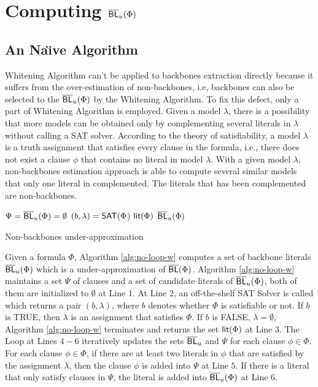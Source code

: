 \section{Computing $\overline{\textsf{BL}}_u(\Phi)$}




\subsection{An Na\"{\i}ve Algorithm}



Whitening Algorithm can't be applied to backbones extraction directly because it suffers from the over-estimation of non-backbones, i.e, backbones can also be selected to the $\overline{\textsf{BL}}_u(\Phi)$ by the Whitening Algorithm. To fix this defect, only a part of Whitening Algorithm is employed.
Given a model $\lambda$, there is a possibility that more models can be obtained only by complementing several literals in $\lambda$ without calling a SAT solver. According to the theory of satisfiability, a model $\lambda$ is a truth assignment that satisfies every clause in the formula, i.e., there does not exist a clause $\phi$ that contains no literal in model $\lambda$. With a given model $\lambda$, non-backbones estimation approach is able to compute several similar models that only one literal in complemented. The literals that has been complemented are non-backbones.

\begin{algorithm}
\SetAlgoShortEnd
\SetFillComment
{}

$\Psi=\overline{\textsf{BL}}_u(\Phi)=\emptyset$\;
$(b,\lambda)=\textsf{SAT}(\Phi$)\;
 \Return $\textsf{lit}(\Phi)$\;
\Return $\overline{\textsf{BL}}_u(\Phi)$\;
\caption{Non-backbones under-approximation}
\label{alg:no-loop-w}
\end{algorithm}

Given a formula $\Phi$, Algorithm \ref{alg:no-loop-w} computes a set of backbone literals $\overline{\textsf{BL}}_u(\Phi)$ which is a under-approximation of $\overline{\textsf{BL}}(\Phi)$.
Algorithm \ref{alg:no-loop-w} maintains a set $\Psi$ of clauses and a set of candidate literals of $\overline{\textsf{BL}}_u(\Phi)$, both of them are initialized to $\emptyset$ at Line $1$.
At Line $2$, an off-the-shelf SAT Solver is called which returns a pair $(b,\lambda)$, where $b$ denotes whether $\Phi$ is satisfiable or not. If $b$ is TRUE, then $\lambda$ is an assignment that satisfies
$\Phi$. If $b$ is FALSE, $\lambda=\emptyset$, Algorithm \ref{alg:no-loop-w} terminates and returns the set $\textsf{lit}(\Phi)$ at Line $3$.
The Loop at Lines $4-6$ iteratively updates the sets $\overline{\textsf{BL}}_u$ and $\Psi$ for each clause $\phi\in\Phi$. For each clause $\phi\in\Phi$, if there are at least two literals in $\phi$
that are satisfied by the assignment $\lambda$, then the clause $\phi$ is added into $\Psi$ at Line $5$. If there is a literal that only satisfy clauses in $\Psi$, the literal is added into $\overline{\textsf{BL}}_u(\Phi)$ at Line $6$.

